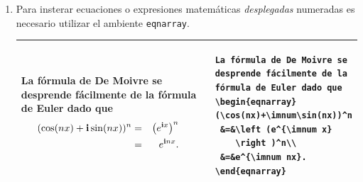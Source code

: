 \documentclass[11pt,letterpaper,twoside]{report}%
\begin{document}
\begin{tipbox}{}
\begin{enumerate}
\begin{center}
\begin{tabular}{|p{65mm}|p{65mm}|}
\begin{minipage}{7cm}
\begin{Verbatim}
\end{Verbatim}
\end{minipage}
\\
\hline
\end{tabular}
\end{center}

\item Para insterar ecuaciones o expresiones matemáticas {\em desplegadas} numeradas es necesario utilizar el ambiente \texttt{eqnarray}.
\vspace*{-\baselineskip}
\begin{center}
\begin{tabular}{|p{65mm}|p{65mm}|}
\hline
\parbox[t]{6cm}{
La fórmula de De Moivre se desprende fácilmente de la fórmula de Euler dado que
{\small
\begin{eqnarray}
\hspace*{-1em}(\cos(nx)+\mathbf{i}\sin(nx))^n
        &=&\left (e^{\mathbf{i} x}\right )^n\\
        &=&e^{\mathbf{i} nx}.
\end{eqnarray}
}
}
& \vspace*{-.5\baselineskip}
\begin{minipage}{7cm}
\begin{Verbatim}
La fórmula de De Moivre se 
desprende fácilmente de la 
fórmula de Euler dado que
\begin{eqnarray}
(\cos(nx)+\imnum\sin(nx))^n
 &=&\left (e^{\imnum x}
    \right )^n\\
 &=&e^{\imnum nx}.
\end{eqnarray}

\end{Verbatim}
\end{minipage}
\\
\hline
\end{tabular}
\end{center}

\end{enumerate}

\end{tipbox}
\end{document}
